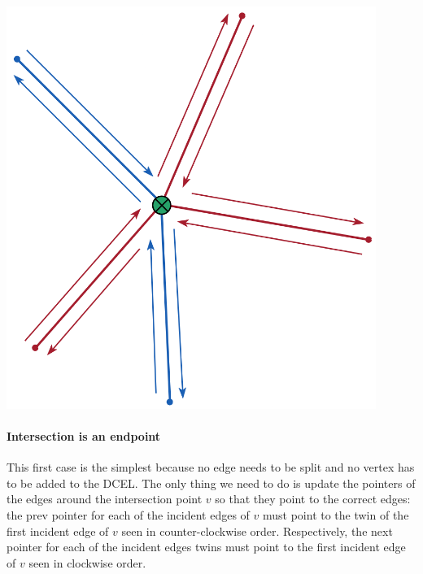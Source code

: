 \begin{minipage}{0.3\textwidth}
    \centering
    \includegraphics[width=0.9\textwidth]{images/vertex.png}
\end{minipage}\hfill
\begin{minipage}{0.7\textwidth}
    \paragraph*{Intersection is an endpoint}
    This first case is the simplest because no edge needs to be split and no vertex has to be added to the DCEL. The only thing we need to do is update the pointers of the edges around the intersection point $v$ so that they point to the correct edges: the prev pointer for each of the incident edges of $v$ must point to the twin of the first incident edge of $v$ seen in counter-clockwise order. Respectively, the next pointer for each of the incident edges twins must point to the first incident edge of $v$ seen in clockwise order.
\end{minipage}
\break


